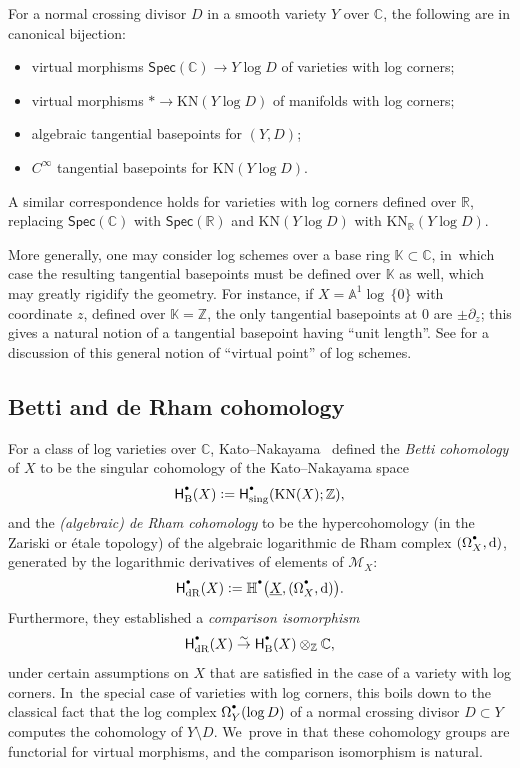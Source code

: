 \documentclass[JEP,XML,SOM,Unicode,NoFloatCountersInSection,published]{cedram}
\let\oldbullet\bullet
\renewcommand{\bullet}{{\raisebox{1pt}{$\scriptscriptstyle\oldbullet$}}}
\newcommand{\rbirac}[1]{\bigl(#1\bigr)}
\newcommand{\bHH}[2][\bullet]{\mathbb{H}^{#1}\rbirac{#2}}
\theoremstyle{definition}
\theoremstyle{remark}
\newenvironment{remark}
  {\pushQED{\qed}\renewcommand{\qedsymbol}{$\lozenge$}\remarkx}
  {\popQED\endremarkx}
\let\defn\emph
\newcommand{\CC}{\mathbb{C}}
\newcommand{\KK}{\mathbb{K}}
\newcommand{\RR}{\mathbb{R}}
\newcommand{\ZZ}{\mathbb{Z}}
\newcommand{\AF}{\mathbb{A}}
\newcommand{\logcyl}{\AF^1 \log\, \{0\}}
\newcommand{\defas}{\mathrel{\mathop:}=}
\newcommand{\rbrac}[1]{\left(#1\right)}
\newcommand{\cM}{\mathscr{M}}
\newcommand{\dd}{\mathrm{d}}
\newcommand{\cvf}[1]{\partial_{#1}}
\newcommand{\uX}{\underline{X}}
\newcommand{\KN}[1]{\mathrm{KN}(#1)}
\newcommand{\KNR}[1]{\mathrm{KN}_\RR\rbrac{#1}}
\newcommand{\Spec}[1]{\mathsf{Spec}(#1)}
\newcommand{\HdR}[2][\bullet]{\mathsf{H}_{\mathrm{dR}}^{#1}(#2)}
\newcommand{\HB}[2][\bullet]{\mathsf{H}_{\mathrm{B}}^{#1}(#2)}
\newcommand{\forms}[2][\bullet]{\Omega^{#1}_{#2}}
\begin{document}
\begin{proposition}\label{prop:basepoints-alg-vs-diff}
For a normal crossing divisor $D$ in a smooth variety $Y$ over $\CC$, the following are in canonical bijection:
\begin{itemize}
\item virtual morphisms $\Spec{\CC} \to Y \log D$ of varieties with log corners;
\item virtual morphisms $* \to \KN{Y\log D}$ of manifolds with log corners;
\item algebraic tangential basepoints for $(Y,D)$;
\item $C^\infty$ tangential basepoints for $\KN{Y \log D}$.
\end{itemize}
\end{proposition}

A similar correspondence holds for varieties with log corners defined over $\RR$, replacing $\Spec{\CC}$ with $\Spec{\RR}$ and $\KN{Y\log D}$ with $\KNR{Y\log D}$.

\begin{remark}\label{rmk:basepoints-over-Z}
More generally, one may consider log schemes over a base ring $\KK\subset \CC$, in~which case the resulting tangential basepoints must be defined over $\KK$ as well, which may greatly rigidify the geometry. For instance, if $X = \logcyl$ with coordinate $z$, defined over $\KK = \ZZ$, the only tangential basepoints at $0$ are $\pm\cvf{z}$; this gives a natural notion of a tangential basepoint having ``unit length''. See \cite{DPP:WeakMorphisms} for a discussion of this general notion of ``virtual point'' of log schemes.
\end{remark}

\subsection{Betti and de Rham cohomology}
For a class of log varieties over $\CC$, Kato--Nakayama~\cite{KatoNakayama} defined the \defn{Betti cohomology} of $X$ to be the singular cohomology of the Kato--Nakayama space
\[
\HB{X} \defas \mathsf{H}^\bullet_{\mathrm{sing}}(\KN{X};\ZZ),
\]
and the \defn{(algebraic) de Rham cohomology} to be the hypercohomology (in the Zariski or étale topology) of the algebraic logarithmic de Rham complex $(\forms{X},\dd)$, generated by the logarithmic derivatives of elements of $\cM_X$:
\[
\HdR{X} \defas \bHH{\uX,(\forms{X},\dd)}.
\]
Furthermore, they established a \defn{comparison isomorphism}
\begin{align}
\HdR{X} \stackrel{\sim}{\to} \HB{X} \otimes_\ZZ \CC, \label{eq:comparison}
\end{align}
under certain assumptions on $X$ that are satisfied in the case of a variety with log corners. In~the special case of varieties with log corners, this boils down to the classical fact that the log complex $\forms{Y}(\log D)$ of a normal crossing divisor $D \subset Y$ computes the cohomology of $Y \setminus D$. We~prove in \cite{DPP:WeakMorphisms} that these cohomology groups are functorial for virtual morphisms, and the comparison isomorphism is natural.
\end{document}

